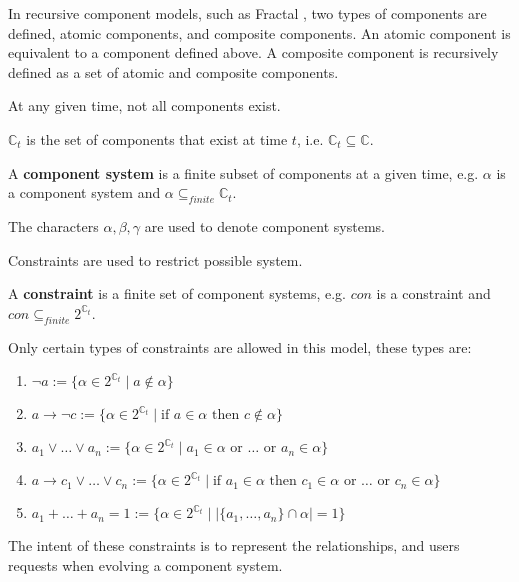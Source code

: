 In recursive component models, such as Fractal \citep{Quma2006}, two types of components are defined, atomic components, and composite components.
An atomic component is equivalent to a component defined above.
A composite component is recursively defined as a set of atomic and composite components.

At any given time, not all components exist.
\begin{defs}
$\mathbb{C}_t$ is the set of components that exist at time $t$, i.e. $\mathbb{C}_t \subseteq \mathbb{C}$.
\end{defs}

\begin{defs}
\label{formal.componentsystemdef}
A \textbf{component system} is a finite subset of components at a given time, e.g. $\alpha$ is a component system and $\alpha \subseteq_{finite} \mathbb{C}_t$. 
\end{defs}
The characters $\alpha,\beta,\gamma$ are used to denote component systems.

Constraints are used to restrict possible system.
\begin{defs}
\label{formal.constraintdefs}
A \textbf{constraint} is a finite set of component systems, e.g. $con$ is a constraint and $con \subseteq_{finite} 2^{\mathbb{C}_t}$.
\end{defs}

Only certain types of constraints are allowed in this model, these types are:
\begin{enumerate}
  \item $\neg a := \{\alpha \in 2^{\mathbb{C}_t} \mid a \not \in \alpha \}$ \label{formal.removeconstraint}
  \item $a \rightarrow \neg c := \{\alpha \in 2^{\mathbb{C}_t} \mid \mbox{if } a \in \alpha \mbox{ then } c \not \in \alpha\}$ \label{formal.conflictconstraint}
  \item $a_1 \vee \ldots \vee a_n := \{\alpha \in 2^{\mathbb{C}_t} \mid a_1 \in \alpha \mbox{ or }\ldots \mbox{ or } a_n \in \alpha\}$ \label{formal.keepconstraint}
  \item $a \rightarrow c_1 \vee \ldots \vee c_n := \{\alpha \in 2^{\mathbb{C}_t} \mid \mbox{if } a_1 \in \alpha \mbox{ then }  c_1 \in \alpha \mbox{ or } \ldots \mbox{ or } c_n \in \alpha\}$ \label{formal.dependencyconstraint}
  \item $a_1 + \ldots + a_n = 1 := \{\alpha \in 2^{\mathbb{C}_t} \mid |\{a_1,\ldots,a_n\} \cap \alpha| = 1\}$ \label{formal.upgradeconstraint}
\end{enumerate}
The intent of these constraints is to represent the relationships, and users requests when evolving a component system.

